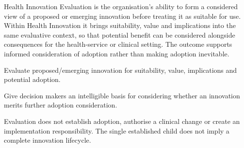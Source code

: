 Health Innovation Evaluation is the organisation's ability to form a considered view of a proposed or emerging innovation before treating it as suitable for use. Within Health Innovation it brings suitability, value and implications into the same evaluative context, so that potential benefit can be considered alongside consequences for the health-service or clinical setting. The outcome supports informed consideration of adoption rather than making adoption inevitable.



Evaluate proposed/\allowbreak{}emerging innovation for suitability, value, implications and potential adoption.



Give decision makers an intelligible basis for considering whether an innovation merits further adoption consideration.



Evaluation does not establish adoption, authorise a clinical change or create an implementation responsibility. The single established child does not imply a complete innovation lifecycle.


